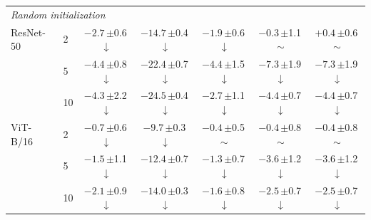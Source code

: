 \begin{table}[htbp]
\begin{tabular}{llccccc}
\midrule
\multicolumn{7}{l}{\textit{Random initialization}} \\
ResNet-50 & 2 & $-2.7$\,{\scriptsize$\pm$0.6}\,$\downarrow$ & $-14.7$\,{\scriptsize$\pm$0.4}\,$\downarrow$ & $-1.9$\,{\scriptsize$\pm$0.6}\,$\downarrow$ & $-0.3$\,{\scriptsize$\pm$1.1}\,$\sim$ & $+0.4$\,{\scriptsize$\pm$0.6}\,$\sim$ \\
 & 5 & $-4.4$\,{\scriptsize$\pm$0.8}\,$\downarrow$ & $-22.4$\,{\scriptsize$\pm$0.7}\,$\downarrow$ & $-4.4$\,{\scriptsize$\pm$1.5}\,$\downarrow$ & $-7.3$\,{\scriptsize$\pm$1.9}\,$\downarrow$ & $-7.3$\,{\scriptsize$\pm$1.9}\,$\downarrow$ \\
 & 10 & $-4.3$\,{\scriptsize$\pm$2.2}\,$\downarrow$ & $-24.5$\,{\scriptsize$\pm$0.4}\,$\downarrow$ & $-2.7$\,{\scriptsize$\pm$1.1}\,$\downarrow$ & $-4.4$\,{\scriptsize$\pm$0.7}\,$\downarrow$ & $-4.4$\,{\scriptsize$\pm$0.7}\,$\downarrow$ \\
\addlinespace[2pt]
ViT-B/16 & 2 & $-0.7$\,{\scriptsize$\pm$0.6}\,$\downarrow$ & $-9.7$\,{\scriptsize$\pm$0.3}\,$\downarrow$ & $-0.4$\,{\scriptsize$\pm$0.5}\,$\sim$ & $-0.4$\,{\scriptsize$\pm$0.8}\,$\sim$ & $-0.4$\,{\scriptsize$\pm$0.8}\,$\sim$ \\
 & 5 & $-1.5$\,{\scriptsize$\pm$1.1}\,$\downarrow$ & $-12.4$\,{\scriptsize$\pm$0.7}\,$\downarrow$ & $-1.3$\,{\scriptsize$\pm$0.7}\,$\downarrow$ & $-3.6$\,{\scriptsize$\pm$1.2}\,$\downarrow$ & $-3.6$\,{\scriptsize$\pm$1.2}\,$\downarrow$ \\
 & 10 & $-2.1$\,{\scriptsize$\pm$0.9}\,$\downarrow$ & $-14.0$\,{\scriptsize$\pm$0.3}\,$\downarrow$ & $-1.6$\,{\scriptsize$\pm$0.8}\,$\downarrow$ & $-2.5$\,{\scriptsize$\pm$0.7}\,$\downarrow$ & $-2.5$\,{\scriptsize$\pm$0.7}\,$\downarrow$ \\
\bottomrule
\end{tabular}
\end{table}
